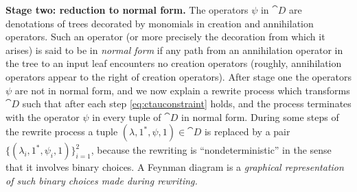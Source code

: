 \documentclass[english,letter paper,12pt,leqno]{article}
\theoremstyle{example}
\numberwithin{equation}{section}
\begin{document}
\textbf{Stage two: reduction to normal form.} The operators $\psi$ in $\cat{D}$ are denotations of trees decorated by monomials in creation and annihilation operators. Such an operator (or more precisely the decoration from which it arises) is said to be in \emph{normal form} if any path from an annihilation operator in the tree to an input leaf encounters no creation operators (roughly, annihilation operators appear to the right of creation operators). After stage one the operators $\psi$ are not in normal form, and we now explain a rewrite process which transforms $\cat{D}$ such that after each step \eqref{eq:ctauconstraint} holds, and the process terminates with the operator $\psi$ in every tuple of $\cat{D}$ in normal form. During some steps of the rewrite process a tuple $(\lambda, 1^*, \psi, 1) \in \cat{D}$ is replaced by a pair $\{ (\lambda_i, 1^*, \psi_i, 1) \}_{i=1}^2$, because the rewriting is ``nondeterministic'' in the sense that it involves binary choices. A Feynman diagram is a \emph{graphical representation of such binary choices made during rewriting.} 
\end{document}

